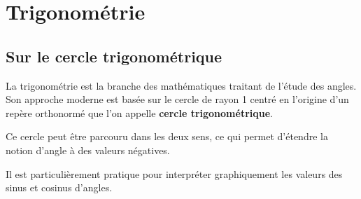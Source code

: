 \documentclass[oneside,12pt]{article}
\let\stdsection\section
\renewcommand\section{\newpage\stdsection}
\begin{document}
\section{Trigonométrie}

\subsection{Sur le cercle trigonométrique}

\begin{minipage}{0.6\linewidth} \restoreskip
    La trigonométrie est la branche des mathématiques traitant de l'étude des angles. Son approche moderne est basée sur le cercle de rayon 1 centré en l'origine d'un repère orthonormé que l'on appelle \textbf{cercle trigonométrique}.
    
    Ce cercle peut être parcouru dans les deux sens, ce qui permet d'étendre la notion d'angle à des valeurs négatives.

    Il est particulièrement pratique pour interpréter graphiquement les valeurs des sinus et cosinus d'angles.
\end{minipage}\hfill
\begin{minipage}{0.35\linewidth}
\end{minipage}
\end{document}
